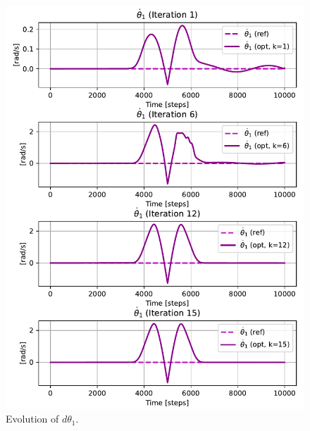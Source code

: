 \begin{figure}[htb]
    \centering
    \includegraphics[width=1\linewidth]{img/1-Task1/th1dot_evolution.pdf}
    \caption{Evolution of $d\theta_1$.}
    \label{fig:dtheta1-evolution}
\end{figure}

